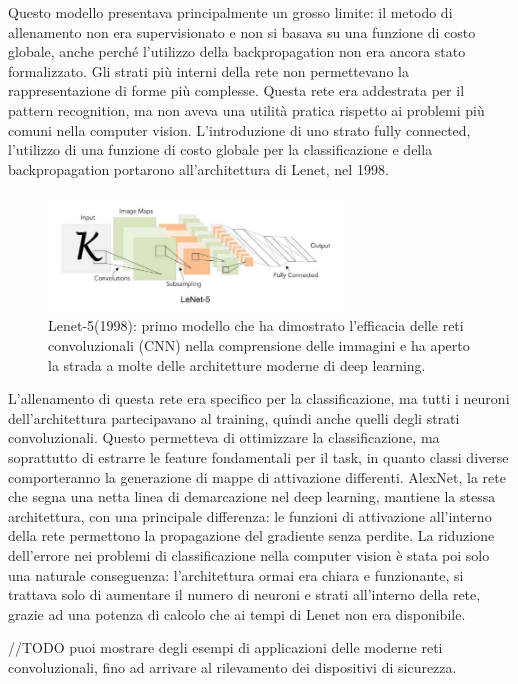 Questo modello presentava principalmente un grosso limite: il metodo di allenamento non era supervisionato e non si basava su una funzione di costo globale, anche perché l'utilizzo della backpropagation non era ancora stato formalizzato. Gli strati più interni della rete non permettevano la rappresentazione di forme più complesse. Questa rete era addestrata per il pattern recognition, ma non aveva una utilità pratica rispetto ai problemi più comuni nella computer vision. L'introduzione di uno strato fully connected, l'utilizzo di una funzione di costo globale per la classificazione e della backpropagation portarono all'architettura di Lenet, nel 1998. 

\begin{figure}[htbp]
    \centering
    \includegraphics[width=0.7\textwidth]{figures/Lenet.png}
    \caption{Lenet-5(1998): primo modello che ha dimostrato l'efficacia delle reti convoluzionali (CNN) nella comprensione delle immagini e ha aperto la strada a molte delle architetture moderne di deep learning. }
    \label{fig:Lenet-5}
\end{figure}


L'allenamento di questa rete era specifico per la classificazione, ma tutti i neuroni dell'architettura partecipavano al training, quindi anche quelli degli strati convoluzionali. Questo permetteva di ottimizzare la classificazione, ma soprattutto di estrarre le feature fondamentali per il task, in quanto classi diverse comporteranno la generazione di mappe di attivazione differenti. AlexNet, la rete che segna una netta linea di demarcazione nel deep learning, mantiene la stessa architettura, con una principale differenza: le funzioni di attivazione all'interno della rete permettono la propagazione del gradiente senza perdite. La riduzione dell'errore nei problemi di classificazione nella computer vision è stata poi solo una naturale conseguenza: l'architettura ormai era chiara e funzionante, si trattava solo di aumentare il numero di neuroni e strati all'interno della rete, grazie ad una potenza di calcolo che ai tempi di Lenet non era disponibile.  
   
//TODO puoi mostrare degli esempi di applicazioni delle moderne reti convoluzionali, fino ad arrivare al rilevamento dei dispositivi di sicurezza.

